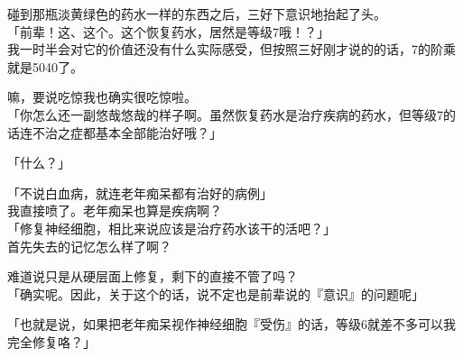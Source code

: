 碰到那瓶淡黄绿色的药水一样的东西之后，三好下意识地抬起了头。\\

「前辈！这、这个。这个恢复药水，居然是等级7哦！？」\\

我一时半会对它的价值还没有什么实际感受，但按照三好刚才说的的话，7的阶乘就是5040了。

嘛，要说吃惊我也确实很吃惊啦。\\

「你怎么还一副悠哉悠哉的样子啊。虽然恢复药水是治疗疾病的药水，但等级7的话连不治之症都基本全部能治好哦？」

「什么？」

「不说白血病，就连老年痴呆都有治好的病例」\\

我直接喷了。老年痴呆也算是疾病啊？\\

「修复神经细胞，相比来说应该是治疗药水该干的活吧？」\\

首先失去的记忆怎么样了啊？

难道说只是从硬层面上修复，剩下的直接不管了吗？\\

「确实呢。因此，关于这个的话，说不定也是前辈说的『意识』的问题呢」

「也就是说，如果把老年痴呆视作神经细胞『受伤』的话，等级6就差不多可以我完全修复咯？」

